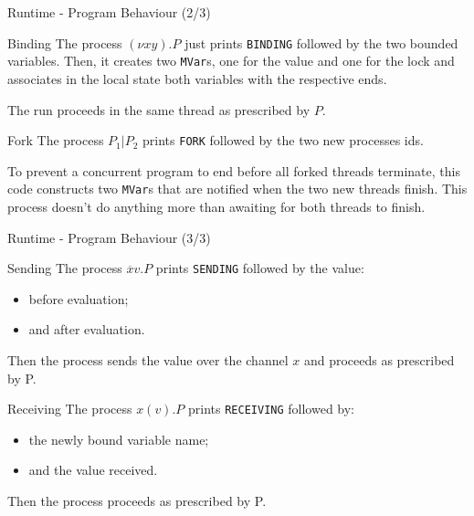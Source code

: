 \begin{frame}{Runtime - Program Behaviour (2/3)}
    \begin{block}{Binding}
        The process $(\nu x y) . P$ just prints \texttt{BINDING} followed by the two bounded variables. Then, it creates two \texttt{MVar}s, one for the value and one for the lock and associates in the local state both variables with the respective ends.

        The run proceeds in the same thread as prescribed by $P$.
    \end{block}

    \begin{block}{Fork}
        The process $P_1 | P_2$ prints \texttt{FORK} followed by the two new processes ids.

        To prevent a concurrent program to end before all forked threads terminate, this code constructs two \texttt{MVar}s that are notified when the two new threads finish. This process doesn't do anything more than awaiting for both threads to finish.
    \end{block}
\end{frame}

\begin{frame}{Runtime - Program Behaviour (3/3)}
    \begin{block}{Sending}
        The process $\overline{x} v . P$ prints \texttt{SENDING} followed by the value: 
        \begin{itemize}
            \item before evaluation;
            \item and after evaluation.
        \end{itemize}
        
        Then the process sends the value over the channel $x$ and proceeds as prescribed by P.
    \end{block}

    \begin{block}{Receiving}
        The process $x(v) . P$ prints \texttt{RECEIVING} followed by: 
        \begin{itemize}
            \item the newly bound variable name;
            \item and the value received.
        \end{itemize}
        
        Then the process proceeds as prescribed by P.
    \end{block}
\end{frame}